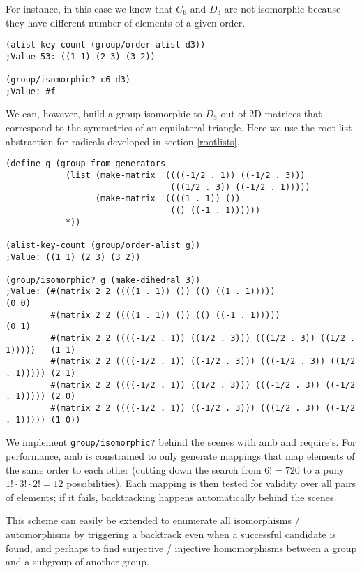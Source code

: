\documentclass{article}
\begin{document}
            For instance, in this case we know that $C_{6}$ and $D_3$ are not isomorphic because they have different number of elements of a given order.

\begin{verbatim}
(alist-key-count (group/order-alist d3))
;Value 53: ((1 1) (2 3) (3 2))

(group/isomorphic? c6 d3)
;Value: #f
\end{verbatim}

            We can, however, build a group isomorphic to $D_3$ out of 2D matrices that correspond to the symmetries of an equilateral triangle. Here we use the root-list abstraction for radicals developed in section \ref{rootlists}.
		
\begin{verbatim}
(define g (group-from-generators
     	    (list (make-matrix '((((-1/2 . 1)) ((-1/2 . 3)))
				                 (((1/2 . 3)) ((-1/2 . 1)))))
		          (make-matrix '((((1 . 1)) ())
				                 (() ((-1 . 1))))))
	        *))

(alist-key-count (group/order-alist g))
;Value: ((1 1) (2 3) (3 2))

(group/isomorphic? g (make-dihedral 3))
;Value: (#(matrix 2 2 ((((1 . 1)) ()) (() ((1 . 1)))))                          (0 0) 
         #(matrix 2 2 ((((1 . 1)) ()) (() ((-1 . 1)))))                         (0 1) 
         #(matrix 2 2 ((((-1/2 . 1)) ((1/2 . 3))) (((1/2 . 3)) ((1/2 . 1)))))   (1 1)
         #(matrix 2 2 ((((-1/2 . 1)) ((-1/2 . 3))) (((-1/2 . 3)) ((1/2 . 1))))) (2 1) 
         #(matrix 2 2 ((((-1/2 . 1)) ((1/2 . 3))) (((-1/2 . 3)) ((-1/2 . 1))))) (2 0) 
         #(matrix 2 2 ((((-1/2 . 1)) ((-1/2 . 3))) (((1/2 . 3)) ((-1/2 . 1))))) (1 0))
\end{verbatim}
		
            We implement \texttt{group/isomorphic?} behind the scenes with amb and require's. For performance, amb is constrained to only generate mappings that map elements of the same order to each other (cutting down the search from $6! = 720$ to a puny $1! \cdot 3! \cdot 2! = 12$ possibilities). Each mapping is then tested for validity over all pairs of elements; if it fails, backtracking happens automatically behind the scenes.
		
            This scheme can easily be extended to enumerate all isomorphisms / automorphisms by triggering a backtrack even when a successful candidate is found, and perhaps to find surjective / injective homomorphisms between a group and a subgroup of another group.    
    
\end{document}
